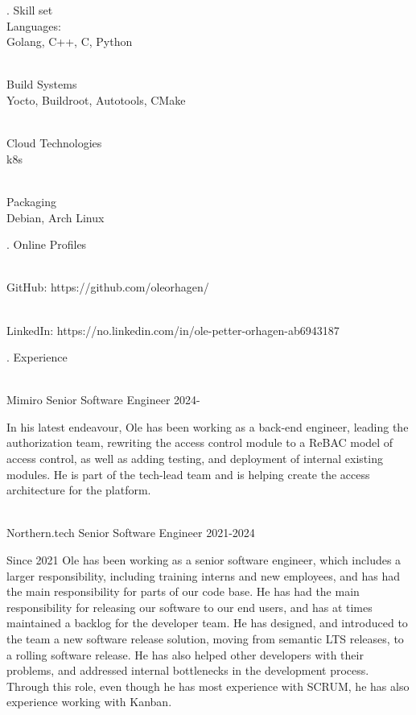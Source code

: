 \finishpage

. {Skill set}
\\ Languages:
\\ \star Golang, C++, C, Python

\\ Build Systems
\\ \star Yocto, Buildroot, Autotools, CMake

\\ Cloud Technologies
\\ \star k8s

\\ Packaging
\\ \star Debian, Arch Linux

. {Online Profiles}

\\ \star GitHub: https://github.com/oleorhagen/

\\ \star LinkedIn: https://no.linkedin.com/in/ole-petter-orhagen-ab6943187

. {Experience}


\\ \star Mimiro Senior Software Engineer 2024-

In his latest endeavour, Ole has been working as a back-end engineer, leading the
authorization team, rewriting the access control module to a ReBAC model of
access control, as well as adding testing, and deployment of internal existing
modules. He is part of the tech-lead team and is helping create the access
architecture for the platform.

\\ \star Northern.tech Senior Software Engineer 2021-2024

Since 2021 Ole has been working as a senior software engineer, which includes a
larger responsibility, including training interns and new employees, and has had
the main responsibility for parts of our code base. He has had the main
responsibility for releasing our software to our end users, and has at times
maintained a backlog for the developer team. He has designed, and introduced to
the team a new software release solution, moving from semantic LTS releases, to
a rolling software release. He has also helped other developers with their
problems, and addressed internal bottlenecks in the development process. Through
this role, even though he has most experience with SCRUM, he has also experience
working with Kanban.

